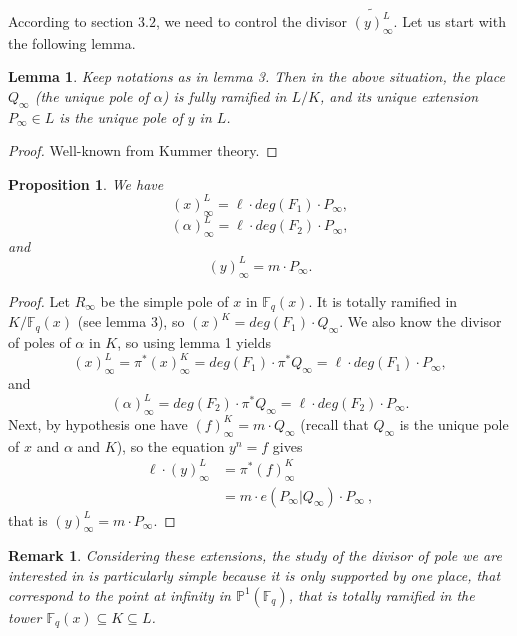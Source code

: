 \documentclass[10pt]{article}
\newtheorem{prop1}{Proposition}[]
\newtheorem{lem1}{Lemma}[]
\newtheorem{rq1}{Remark}[]
\newcommand{\s}{\vspace{0.3cm}}
\newcommand{\cd}{\cdot}
\newcommand{\fq}{\mathbb{F}_q}
\newcommand{\su}{\subseteq}
\begin{document}
\s


According to section $3.2$, we need to control the divisor $\widetilde{(y)^L_{\infty}}$. Let us start with the following lemma.

\s

\begin{lem1}
Keep notations as in lemma 3. Then in the above situation, the place $Q_{\infty}$ (the unique pole of $\alpha$) is fully ramified in $L/K$, and its unique extension $P_{\infty} \in L$ is the unique pole of $y$ in $L$. 
\end{lem1}

\s

\begin{proof}
Well-known from Kummer theory.
\end{proof}

\s

\begin{prop1}
We have
\[(x)^L_{\infty} = \ell \cd deg(F_1) \cd P_{\infty},\]
\[(\alpha)^L_{\infty} = \ell \cd deg(F_2) \cd P_{\infty},\]
and
\[(y)^L_{\infty} = m \cd P_{\infty}.\]
\end{prop1}

\s

\begin{proof}
Let $R_{\infty}$ be the simple pole of $x$ in $\fq(x)$. It is totally ramified in $K/\fq(x)$ (see lemma 3), so $(x)^K = deg(F_1) \cd Q_{\infty}$. We also know the divisor of poles of $\alpha$ in $K$, so using lemma 1 yields
\[(x)^L_{\infty} = \pi^*(x)^K_{\infty} = deg(F_1) \cd \pi^*Q_{\infty} = \ell \cd deg(F_1) \cd P_{\infty},\]
and
\[(\alpha)^L_{\infty} = deg(F_2) \cd \pi^*Q_{\infty} = \ell \cd deg(F_2) \cd P_{\infty}.\]
Next, by hypothesis one have $(f)^K_{\infty} = m \cd Q_{\infty}$ (recall that $Q_{\infty}$ is the unique pole of $x$ and $\alpha$ and $K$), so the equation $y^n=f$ gives
\begin{align*} \ell \cd (y)^L_{\infty} &= \pi^*(f)^K_{\infty} \\
&= m \cd e(P_{\infty}|Q_{\infty}) \cd P_{\infty} \ ,
\end{align*}
that is $(y)^L_{\infty} = m \cd P_{\infty}.$
\end{proof}

\s

\begin{rq1} \rm Considering these extensions, the study of the divisor of pole we are interested in is particularly simple because it is only supported by one place, that correspond to the point at infinity in $\mathbb{P}^1(\fq)$, that is totally ramified in the tower $\fq(x)\su K \su L$.
\end{rq1}
\end{document}
